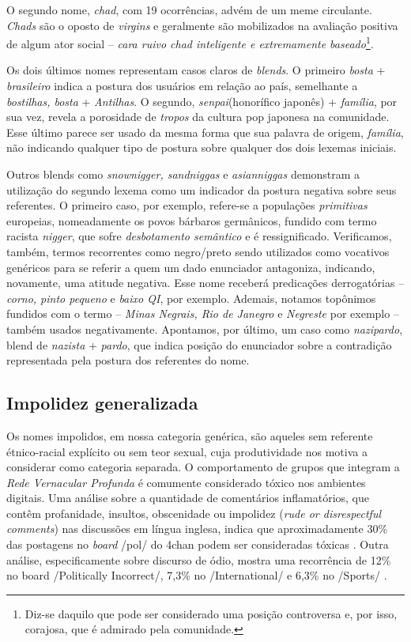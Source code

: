 \documentclass[portuguese]{textolivre}
\begin{document}
O segundo nome, \emph{chad}, com 19 ocorrências, advém de um meme circulante. \emph{Chads} são o oposto de \emph{virgins} e geralmente são mobilizados na avaliação positiva de algum ator social – \emph{cara ruivo chad inteligente e extremamente baseado}\footnote{Diz-se daquilo que pode ser considerado uma posição controversa e, por isso, corajosa, que é admirado pela comunidade.}. 

Os dois últimos nomes representam casos claros de \emph{blends}. O primeiro \emph{bosta} + \emph{brasileiro} indica a postura dos usuários em relação ao país, semelhante a \emph{bostilhas, bosta} + \emph{Antilhas}. O segundo, \emph{senpai}(honorífico japonês) + \emph{família}, por sua vez, revela a porosidade de \emph{tropos} da cultura pop japonesa na comunidade. Esse último parece ser usado da mesma forma que sua palavra de origem, \emph{família}, não indicando qualquer tipo de postura sobre qualquer dos dois lexemas iniciais.

Outros blends como \emph{snownigger, sandniggas} e \emph{asianniggas} demonstram a utilização do segundo lexema como um indicador da postura negativa sobre seus referentes. O primeiro caso, por exemplo, refere-se a populações \emph{primitivas} europeias, nomeadamente os povos bárbaros germânicos, fundido com termo racista \emph{nigger}, que sofre \emph{desbotamento semântico} e é ressignificado. Verificamos, também, termos recorrentes como negro/preto sendo utilizados como vocativos genéricos para se referir a quem um dado enunciador antagoniza, indicando, novamente, uma atitude negativa. Esse nome receberá predicações derrogatórias – \emph{corno, pinto pequeno} e \emph{baixo QI}, por exemplo. Ademais, notamos topônimos fundidos com o termo – \emph{Minas Negrais, Rio de Janegro} e \emph{Negreste} por exemplo – também usados negativamente. Apontamos, por último, um caso como \emph{nazipardo}, blend de \emph{nazista} + \emph{pardo}, que indica posição do enunciador sobre a contradição representada pela postura dos referentes do nome.



\subsection{Impolidez generalizada}

Os nomes impolidos, em nossa categoria genérica, são aqueles sem referente étnico-racial explícito ou sem teor sexual, cuja produtividade nos motiva a considerar como categoria separada. O comportamento de grupos que integram a \emph{Rede Vernacular Profunda} é comumente considerado tóxico nos ambientes digitais. Uma análise sobre a quantidade de comentários inflamatórios, que contêm profanidade, insultos, obscenidade ou impolidez (\emph{rude or disrespectful comments}) nas discussões em língua inglesa, indica que aproximadamente 30\% das postagens no \emph{board} /pol/ do 4chan podem ser consideradas tóxicas \cite{papasavva2020raiders}. Outra análise, especificamente sobre discurso de ódio, mostra uma recorrência de 12\% no board /Politically Incorrect/, 7,3\% no /International/ e 6,3\% no /Sports/ \cite{hine2017kek}.
\end{document}
